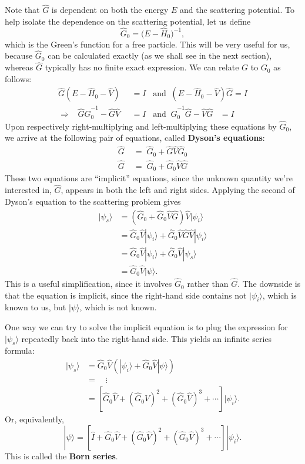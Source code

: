 \documentclass[pra,12pt]{revtex4}
\begin{document}
Note that $\hat{G}$ is dependent on both the energy $E$ and the
scattering potential.  To help isolate the dependence on the
scattering potential, let us define
$$\hat{G}_0=\big(E-\hat{H}_0\big)^{-1},$$
which is the Green's function for a free particle.  This will be very
useful for us, because $\hat{G}_0$ can be calculated exactly (as we
shall see in the next section), whereas $\hat{G}$ typically has no
finite exact expression.  We can relate $G$ to $G_0$ as follows:
$$\begin{aligned}\hat{G}(E-\hat{H}_0 - \hat{V})\;\; &= I \;\;\;\mathrm{and}\;\; (E-\hat{H}_0 - \hat{V})\hat{G} = I \\ \Rightarrow \;\;\; \hat{G} \hat{G}_0^{-1} - \hat{G}\hat{V} &= I \;\;\; \mathrm{and}\;\; \hat{G}_0^{-1} \hat{G} - \hat{V}\hat{G} \;\;\;= I\end{aligned}$$
Upon respectively right-multiplying and left-multiplying these equations
by $\hat{G}_0$, we arrive at the following pair of equations, called
\textbf{Dyson's equations}:
$$\boxed{\begin{aligned} \;\;\hat{G} \;&= \; \hat{G}_0 + \hat{G}\hat{V}\hat{G}_0\;\; \\ \;\;\hat{G} \;&=\; \hat{G}_0 + \hat{G}_0\hat{V}\hat{G} \;\;\end{aligned}}$$
These two equations are ``implicit'' equations, since the unknown
quantity we're interested in, $\hat{G}$, appears in both the left and
right sides.  Applying the second of Dyson's equation to the
scattering problem gives
$$\begin{aligned}|\psi_s\rangle &= \left(\hat{G}_0 + \hat{G}_0\hat{V}\hat{G}\right) \hat{V} |\psi_i\rangle \\ &= \hat{G}_0 \hat{V} |\psi_i\rangle + \hat{G}_0\hat{V}\hat{G} \hat{V} |\psi_i\rangle \\ &= \hat{G}_0 \hat{V} |\psi_i\rangle + \hat{G}_0\hat{V} |\psi_s\rangle \\ &= \hat{G}_0\hat{V} |\psi\rangle.\end{aligned}$$
This is a useful simplification, since it involves $\hat{G}_0$ rather
than $\hat{G}$.  The downside is that the equation is implicit, since
the right-hand side contains not $|\psi_i\rangle$, which is known to
us, but $|\psi\rangle$, which is not known.

One way we can try to solve the implicit equation is to plug the
expression for $|\psi_s\rangle$ repeatedly back into the right-hand
side.  This yields an infinite series formula:
$$\begin{aligned}|\psi_s\rangle &= \hat{G}_0 \hat{V} \left(|\psi_i\rangle + \hat{G}_0 \hat{V}|\psi\rangle\right) \\ &= \quad \vdots \\ &= \left[\hat{G}_0 \hat{V} + (\hat{G}_0 \hat{V})^2 + (\hat{G}_0 \hat{V})^3 + \cdots\right]|\psi_i\rangle.\end{aligned}$$
Or, equivalently,
$$|\psi\rangle = \left[\hat{I} + \hat{G}_0 \hat{V} + (\hat{G}_0 \hat{V})^2 + (\hat{G}_0 \hat{V})^3 + \cdots\right]|\psi_i\rangle.$$
This is called the \textbf{Born series}.
\end{document}
